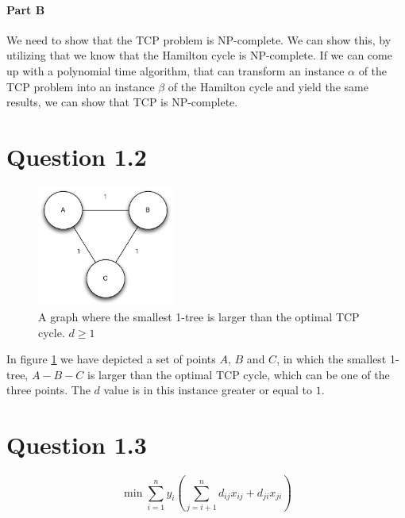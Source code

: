 \documentclass[10pt]{article}
\begin{document}

\paragraph{Part B} %
\label{par:part_b}
We need to show that the TCP problem is NP-complete.  We can show this, by utilizing that we know that the Hamilton cycle is NP-complete. If we can come up with a polynomial time algorithm, that can transform an instance $\alpha$ of the TCP problem into an instance $\beta$ of the Hamilton cycle and yield the same results, we can show that TCP is NP-complete.

\section*{Question 1.2} %
\label{sec:question_1_2}

\begin{figure}
	\centering
	\includegraphics[width=0.4\textwidth]{figures/unicycle.pdf}
	\caption{A graph where the smallest 1-tree is larger than the optimal TCP cycle. $d \geq 1$}
	\label{unicycle}
\end{figure}
In figure \ref{unicycle} we have depicted a set of points $A$, $B$ and $C$, in which the smallest 1-tree, $A-B-C$ is larger than the optimal TCP cycle, which can be one of the three points.
The $d$ value is in this instance greater or equal to $1$.

\section*{Question 1.3} %
\label{sec:question_1_3}


\begin{equation}
  \min \sum_{i=1}^n y_i \left( \sum_{j=i+1}^{n} d_{ij}x_{ij}+d_{ji}x_{ji} \right)
\end{equation}
\end{document}
